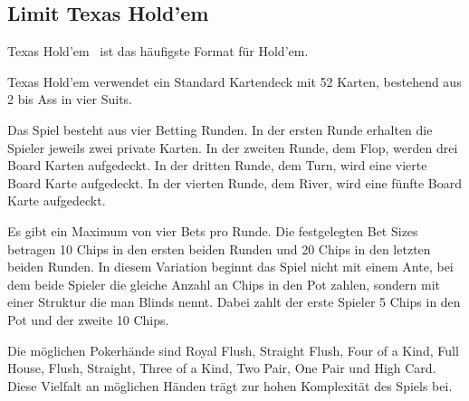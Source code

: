 \subsection{Limit Texas Hold'em}
Texas Hold'em~\cite{southey2005bayes} ist das häufigste Format für Hold'em.

Texas Hold'em verwendet ein Standard Kartendeck mit 52 Karten, bestehend aus 2 bis Ass in vier Suits.

Das Spiel besteht aus vier Betting Runden.
In der ersten Runde erhalten die Spieler jeweils zwei private Karten.
In der zweiten Runde, dem Flop, werden drei Board Karten aufgedeckt.
In der dritten Runde, dem Turn, wird eine vierte Board Karte aufgedeckt.
In der vierten Runde, dem River, wird eine fünfte Board Karte aufgedeckt.

Es gibt ein Maximum von vier Bets pro Runde.
Die festgelegten Bet Sizes betragen 10 Chips in den ersten beiden Runden und 20 Chips in den letzten beiden Runden.
In diesem Variation beginnt das Spiel nicht mit einem Ante, bei dem beide Spieler die gleiche Anzahl an Chips in den Pot zahlen, sondern mit einer Struktur die man Blinds nennt.
Dabei zahlt der erste Spieler 5 Chips in den Pot und der zweite 10 Chips.

Die möglichen Pokerhände sind Royal Flush, Straight Flush, Four of a Kind, Full House, Flush, Straight, Three of a Kind, Two Pair, One Pair und High Card.
Diese Vielfalt an möglichen Händen trägt zur hohen Komplexität des Spiels bei.

